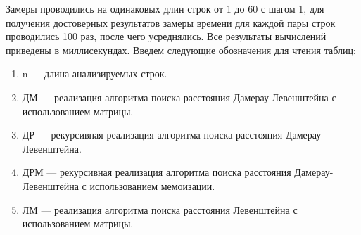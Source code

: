 Замеры проводились на одинаковых длин строк от 1 до 60 с шагом 1, для получения достоверных результатов замеры 
времени для каждой пары строк проводились 100 раз, после чего усреднялись. Все результаты вычислений приведены в миллисекундах.
Введем следующие обозначения для чтения таблиц:
\begin{enumerate}
	\item n --- длина анализируемых строк.
	\item ДМ --- реализация алгоритма поиска расстояния Дамерау-Левенштейна с использованием матрицы.
	\item ДР --- рекурсивная реализация алгоритма поиска расстояния Дамерау-Левенштейна.
	\item ДРМ ---  рекурсивная реализация алгоритма поиска расстояния Дамерау-Левенштейна с использованием мемоизации.
	\item ЛМ --- реализация алгоритма поиска расстояния Левенштейна с использованием матрицы.
\end{enumerate}





